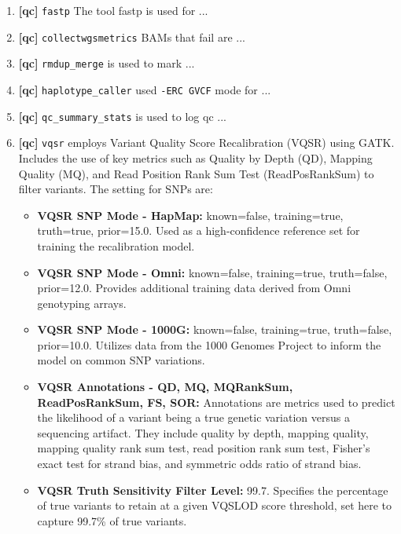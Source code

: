 \begin{tcolorbox}[
    breakable,  %
    colback=white!0,  %
    colframe=black,  %
    boxrule=1pt,  %
    arc=1mm,  %
    outer arc=1mm,
         title=\textbf{\refstepcounter{myboxcounter}\label{box:qv_description_example}Box \themyboxcounter: Example QV description file (highlighting VQSR steps)}
]

\begin{enumerate}
    \item \textbf{[\ac{qc}]} \colorbox{kispiblue!30}{\texttt{fastp}} The tool fastp is used for ...
    \item \textbf{[\ac{qc}]} \colorbox{kispiblue!30}{\texttt{collectwgsmetrics}} BAMs that fail are ...
    \item \textbf{[\ac{qc}]} \colorbox{kispiblue!30}{\texttt{rmdup\_merge}} is used to mark ...
    \item \textbf{[\ac{qc}]} \colorbox{kispiblue!30}{\texttt{haplotype\_caller}} used \texttt{-ERC GVCF} mode for ...
    \item \textbf{[\ac{qc}]} \colorbox{kispiblue!30}{\texttt{\ac{qc}\_summary\_stats}} is used to log \ac{qc} ...
    \item \textbf{[\ac{qc}]} \colorbox{kispiblue!30}{\texttt{vqsr}} employs Variant Quality Score Recalibration (VQSR) using GATK. Includes the use of key metrics such as Quality by Depth (QD), Mapping Quality (MQ), and Read Position Rank Sum Test (ReadPosRankSum) to filter variants. The setting for SNPs are:
\begin{itemize}
    \item \textbf{VQSR SNP Mode - HapMap:} known=false, training=true, truth=true, prior=15.0. Used as a high-confidence reference set for training the recalibration model.
    \item \textbf{VQSR SNP Mode - Omni:} known=false, training=true, truth=false, prior=12.0. Provides additional training data derived from Omni genotyping arrays.
    \item \textbf{VQSR SNP Mode - 1000G:} known=false, training=true, truth=false, prior=10.0. Utilizes data from the 1000 Genomes Project to inform the model on common SNP variations.
    \item \textbf{VQSR Annotations - QD, MQ, MQRankSum, ReadPosRankSum, FS, SOR:} Annotations are metrics used to predict the likelihood of a variant being a true genetic variation versus a sequencing artifact. They include quality by depth, mapping quality, mapping quality rank sum test, read position rank sum test, Fisher's exact test for strand bias, and symmetric odds ratio of strand bias.
    \item \textbf{VQSR Truth Sensitivity Filter Level:} 99.7. Specifies the percentage of true variants to retain at a given VQSLOD score threshold, set here to capture 99.7\% of true variants.
    \end{itemize}    
\end{enumerate}
\end{tcolorbox}

